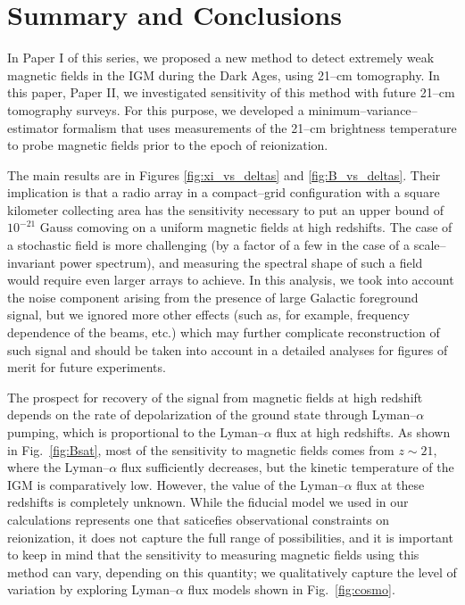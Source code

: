 \section{Summary and Conclusions}
\label{sec:conclusions}

In Paper I of this series, we proposed a new method to detect extremely weak magnetic fields in the IGM during the Dark Ages, using 21--cm tomography. In this paper, Paper II, we investigated sensitivity of this method with future 21--cm tomography surveys. For this purpose, we developed a minimum--variance--estimator formalism that uses measurements of the 21--cm brightness temperature to probe magnetic fields prior to the epoch of reionization. 

The main results are in Figures \ref{fig:xi_vs_deltas} and \ref{fig:B_vs_deltas}. Their implication is that a radio array in a compact--grid configuration with a square kilometer collecting area has the sensitivity necessary to put an upper bound of $10^{-21}$ Gauss comoving on a uniform magnetic fields at high redshifts. The case of a stochastic field is more challenging (by a factor of a few in the case of a scale--invariant power spectrum), and measuring the spectral shape of such a field would require even larger arrays to achieve. In this analysis, we took into account the noise component arising from the presence of large Galactic foreground signal, but we ignored more other effects (such as, for example, frequency dependence of the beams, etc.) which may further complicate reconstruction of such signal and should be taken into account in a detailed analyses for figures of merit for future experiments.

The prospect for recovery of the signal from magnetic fields at high redshift  depends on the rate of depolarization of the ground state through Lyman--$\alpha$ pumping, which is proportional to the Lyman--$\alpha$ flux at high redshifts. As shown in Fig.~\ref{fig:Bsat}, most of the sensitivity to magnetic fields comes from $z\sim 21$, where the Lyman--$\alpha$ flux sufficiently decreases, but the kinetic temperature of the IGM is comparatively low. However, the value of the Lyman--$\alpha$ flux at these redshifts is completely unknown. While the fiducial model we used in our calculations represents one that saticefies observational constraints on reionization, it does not capture the full range of possibilities, and it is important to keep in mind that the sensitivity to measuring magnetic fields using this method can vary, depending on this quantity; we qualitatively capture the level of variation by exploring Lyman--$\alpha$ flux models shown in Fig.~\ref{fig:cosmo}.

